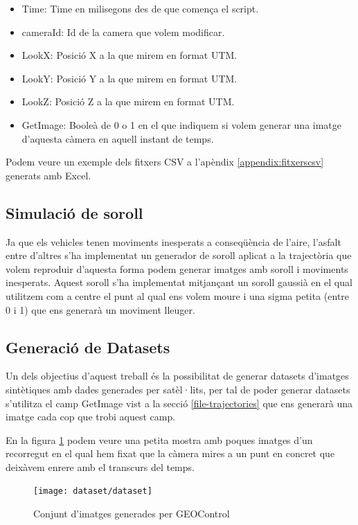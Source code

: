 \documentclass[10pt,a4paper,twocolumn,twoside]{article}
\begin{document}
\begin{itemize}
\item Time: Time en milisegons des de que comença el script.
\item cameraId: Id de la camera que volem modificar.
\item LookX: Posició X a la que mirem en format UTM.
\item LookY: Posició Y a la que mirem en format UTM.
\item LookZ: Posició Z a la que mirem en format UTM.
\item GetImage: Booleà de 0 o 1 en el que indiquem si volem generar una imatge d'aquesta càmera en aquell instant de temps.
\end{itemize}

Podem veure un exemple dels fitxers CSV a l'apèndix \ref{appendix:fitxerscsv} generats amb Excel.

\subsection{Simulació de soroll}
Ja que els vehicles tenen moviments inesperats a conseqüència de l'aire, l'asfalt entre d'altres s'ha implementat un generador de soroll aplicat a la trajectòria que volem reproduir d'aquesta forma podem generar imatges amb soroll i moviments inesperats. Aquest soroll s'ha implementat mitjançant un soroll gaussià en el qual utilitzem com a centre el punt al qual ens volem moure i una sigma petita (entre 0 i 1) que ens generarà un moviment lleuger.

\subsection{Generació de Datasets}
Un dels objectius d'aquest treball és la possibilitat de generar datasets d'imatges sintètiques amb dades generades per satèl·lits, per tal de poder generar datasets s'utilitza el camp GetImage vist a la secció \ref{file-trajectories} que ens generarà una imatge cada cop que trobi aquest camp.

En la figura \ref{fig-dataset} podem veure una petita mostra amb poques imatges d'un recorregut en el qual hem fixat que la càmera mires a un punt en concret que deixàvem enrere amb el transcurs del temps. 

\begin{figure}[!h]
\centering
  	\texttt{[image: dataset/dataset]}
	\caption{Conjunt d'imatges generades per GEOControl}
	\label{fig-dataset}
\end{figure}
\end{document}

